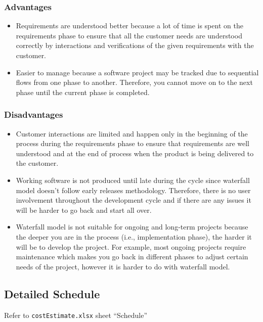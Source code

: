 \documentclass{article}
\begin{document}
\subsubsection{Advantages}
\begin{itemize}
\item Requirements are understood better because a lot of time is spent on the requirements phase to ensure that all the customer needs are understood correctly by interactions and verifications of the given requirements with the customer. 
\item Easier to manage because a software project may be tracked due to sequential flows from one phase to another. Therefore, you cannot move on to the next phase until the current phase is completed.
\end{itemize}

\subsubsection{Disadvantages}
\begin{itemize}
\item Customer interactions are limited and happen only in the beginning of the process during the requirements phase to ensure that requirements are well understood and at the end of process when the product is being delivered to the customer.
\item Working software is not produced until late during the cycle since waterfall model doesn’t follow early releases methodology. Therefore, there is no user involvement throughout the development cycle and if there are any issues it will be harder to go back and start all over.
\item Waterfall model is not suitable for ongoing and long-term projects because the deeper you are in the process (i.e., implementation phase), the harder it will be to develop the project. For example, most ongoing projects require maintenance which makes you go back in different phases to adjust certain needs of the project, however it is harder to do with waterfall model. 
\end{itemize}

\subsection{Detailed Schedule}
Refer to \texttt{costEstimate.xlsx} sheet ``Schedule''
\end{document}
